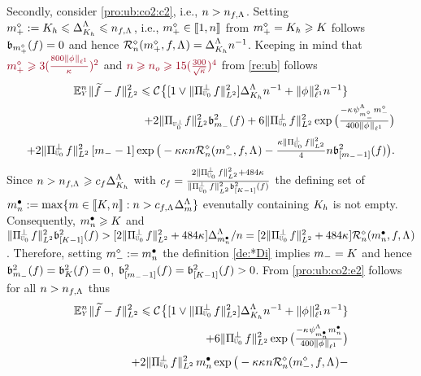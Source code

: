 \begin{pro}
Secondly, consider \ref{pro:ub:co2:c2}, i.e., 
$\ssY>\ssY_{\xdf,\iSv}$. Setting $\pdDi:=K_{\ydf}\leq\DipenSv[K_{\ydf}]\leq\ssY_{\xdf,\iSv}$, i.e., $\pdDi\in\nset{1,\ssY}$ from $\pdDi=K_{\ydf}\geq K$  follows
$\bias[\pdDi](\xdf)=0$ and hence
$\hRa{\pdDi,\xdf,\iSv}=\DipenSv[K_{\ydf}]\ssY^{-1}$. 
Keeping in mind that $\dr\pdDi\geq
3(\tfrac{800\Vnormlp[1]{\fydf}}{\cpen})^2$ and  $\dr
\ssY\geq \ssY_o\geq 15(\tfrac{300}{\sqrt{\cpen}})^4$ 
from
\cref{re:ub} follows
\begin{multline}\label{pro:ub:co2:e2}
\FuEx[\ssY]{\rY}\VnormLp{\txdf-\xdf}^2\leq\cst{}\big\{
[1\vee\VnormLp{\Proj[{\mHiH[0]}]^\perp\xdf}^2]\DipenSv[K_{\ydf}]\ssY^{-1}+\Vnormlp[1]{\fydf}^2
\ssY^{-1}\}\\\hfill
+2\VnormLp{\Proj[{\mHiH[0]^\perp}]\xdf}^2\bias[\mDi]^2(\xdf)
+6\VnormLp{\Proj[{\mHiH[0]}]^\perp\xdf}^2 \exp\big(\tfrac{-\cpen\cmSv[\mdDi]\mdDi}{400\Vnormlp[1]{\fydf}}\big)
\\\hfill
\hfill+2\VnormLp{\Proj[{\mHiH[0]}]^\perp\xdf}^2\,[\mDi-1]\exp\big(-\rWc\cpen\ssY\hRa{\mdDi,\xdf,\iSv}-
    \tfrac{\rWc\VnormLp{\Proj[{\mHiH[0]}]^\perp\xdf}^2}{4}\ssY\bias[{[\mDi-1]}]^2(\xdf)\big).
\end{multline}
Since
$\ssY>\ssY_{\xdf,\iSv}\geq c_{\xdf}\DipenSv[K_{\ydf}]$
with $c_{\xdf}=\tfrac{2\VnormLp{\Proj[{\mHiH[0]}]^\perp\xdf}^2+484\cpen}{\VnormLp{\Proj[{\mHiH[0]}]^\perp\xdf}^2\bias[{[K-1]}]^2(\xdf)}$ the defining set of
$\sDi{\ssY}:=\max\{\Di\in\nset{K,\ssY}:\ssY>c_{\xdf,\iSv}\DipenSv\}$
evenutally containing $K_{\ydf}$ is not empty. Consequently, $\sDi{\ssY}\geq K$ and $\VnormLp{\Proj[{\mHiH[0]}]^\perp\xdf}^2\bias[{[K-1]}]^2(\xdf)>[2\VnormLp{\Proj[{\mHiH[0]}]^\perp\xdf}^2+484\cpen]\DipenSv[\sDi{\ssY}]/\ssY=[2\VnormLp{\Proj[{\mHiH[0]}]^\perp\xdf}^2+484\cpen]\hRa{\sDi{\ssY},\xdf,\iSv}$. Therefore,
  setting $\mdDi:=\sDi{\ssY}$ the definition  \eqref{de:*Di} implies  $\mDi=K$ and hence
  $\bias[\mDi]^2(\xdf)=\bias[K]^2(\xdf)=0$,
  $\bias[{[\mDi-1]}]^2(\xdf)=\bias[{[K-1]}]^2(\xdf)>0$. From
  \eqref{pro:ub:co2:e2} follows for all $\ssY>\ssY_{\xdf,\iSv}$  thus
\begin{multline}\label{pro:ub:co2:e3}
\FuEx[\ssY]{\rY}\VnormLp{\txdf-\xdf}^2\leq\cst{}\big\{
[1\vee\VnormLp{\Proj[{\mHiH[0]}]^\perp\xdf}^2]\DipenSv[K_{\ydf}]\ssY^{-1}+\Vnormlp[1]{\fydf}^2
\ssY^{-1}\}\\\hfill
+6\VnormLp{\Proj[{\mHiH[0]}]^\perp\xdf}^2 \exp\big(\tfrac{-\cpen\cmSv[\sDi{\ssY}]\sDi{\ssY}}{400\Vnormlp[1]{\fydf}}\big)
\\\hfill
\hfill+2\VnormLp{\Proj[{\mHiH[0]}]^\perp\xdf}^2\,\sDi{\ssY}\exp\big(-\rWc\cpen\ssY\hRa{\mdDi,\xdf,\iSv}-

\end{multline}
\end{pro}
